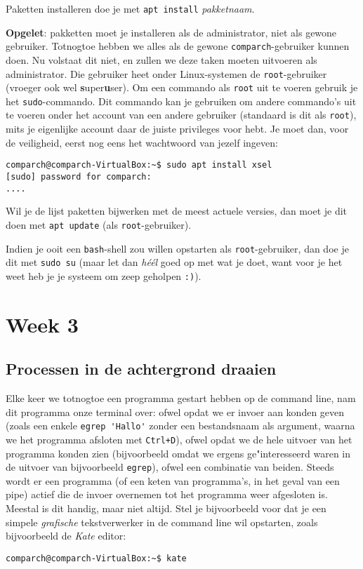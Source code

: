 \documentclass[a4paper,twoside,openany]{memoir}
\begin{document}
Paketten installeren doe je met \verb!apt install! \emph{pakketnaam}.

\textbf{Opgelet}: pakketten moet je installeren als de administrator, niet als
gewone gebruiker. Totnogtoe hebben we alles als de gewone
\verb!comparch!-gebruiker kunnen doen. Nu volstaat dit niet, en zullen we deze
taken moeten uitvoeren als administrator. Die gebruiker heet onder
Linux-systemen de \verb!root!-gebruiker (vroeger ook wel
\textbf{s}uper\textbf{u}ser). Om een commando als \verb!root! uit te voeren
gebruik je het \verb!sudo!-commando. Dit commando kan je gebruiken om andere
commando's uit te voeren onder het account van een andere gebruiker (standaard
is dit als \verb!root!), mits je eigenlijke account daar de juiste privileges
voor hebt. Je moet dan, voor de veiligheid, eerst nog eens het wachtwoord van
jezelf ingeven:

\begin{verbatim}
comparch@comparch-VirtualBox:~$ sudo apt install xsel
[sudo] password for comparch: 
....
\end{verbatim}

Wil je de lijst paketten bijwerken met de meest actuele versies, dan moet je dit
doen met \verb!apt update! (als \verb!root!-gebruiker).

Indien je ooit een \verb!bash!-shell zou willen opstarten als
\verb!root!-gebruiker, dan doe je dit met \verb!sudo su! (maar let dan
\emph{h\'e\'el} goed op met wat je doet, want voor je het weet heb je je systeem
om zeep geholpen \verb!:)!).

\part{Week 3}

\chapter{Processen in de achtergrond draaien}

Elke keer we totnogtoe een programma gestart hebben op de command line, nam dit
programma onze terminal over: ofwel opdat we er invoer aan konden geven (zoals
een enkele \verb!egrep 'Hallo'! zonder een bestandsnaam als argument, waarna we
het programma afsloten met \verb!Ctrl+D!), ofwel opdat we de hele uitvoer van
het programma konden zien (bijvoorbeeld omdat we ergens ge"interesseerd waren
in de uitvoer van bijvoorbeeld \verb!egrep!), ofwel een combinatie van beiden.
Steeds wordt er een programma (of een keten van programma's, in het geval van
een pipe) actief die de invoer overnemen tot het programma weer afgesloten is.
Meestal is dit handig, maar niet altijd. Stel je bijvoorbeeld voor dat je een
simpele \emph{grafische} tekstverwerker in de command line wil opstarten, zoals
bijvoorbeeld de \emph{Kate} editor:
\begin{verbatim}
comparch@comparch-VirtualBox:~$ kate
\end{verbatim}
\end{document}
